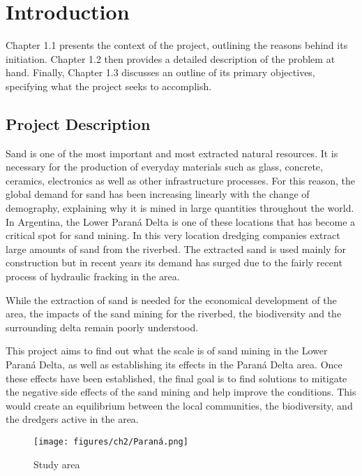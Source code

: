 \chapter{Introduction}
\label{chapter:introduction}

Chapter 1.1 presents the context of the project, outlining the reasons behind its initiation. Chapter 1.2 then provides a detailed description of the problem at hand. Finally, Chapter 1.3 discusses an outline of its primary objectives, specifying what the project seeks to accomplish.

\section{Project Description}
Sand is one of the most important and most extracted natural resources. It is necessary for the production of everyday materials such as glass, concrete, ceramics, electronics as well as other infrastructure processes. For this reason, the global demand for sand has been increasing linearly with the change of demography, explaining why it is mined in large quantities throughout the world. In Argentina, the Lower Paraná Delta is one of these locations that has become a critical spot for sand mining. In this very location dredging companies extract large amounts of sand from the riverbed. The extracted sand is used mainly for construction but in recent years its demand has surged due to the fairly recent process of hydraulic fracking in the area.



While the extraction of sand is needed for the economical development of the area, the impacts of the sand mining for the riverbed, the biodiversity and the surrounding delta remain poorly understood. 

This project aims to find out what the scale is of sand mining in the Lower Paraná Delta, as well as establishing its effects in the Paraná Delta area. Once these effects have been established, the final goal is to find solutions to mitigate the negative side effects of the sand mining and help improve the conditions. This would create an equilibrium between the local communities, the biodiversity, and the dredgers active in the area.

\begin{figure}[H]
    \centering    \texttt{[image: figures/ch2/Paraná.png]}
    \caption{Study area}
    \label{fig:study area}
\end{figure}
\label{Figure 1.1}


